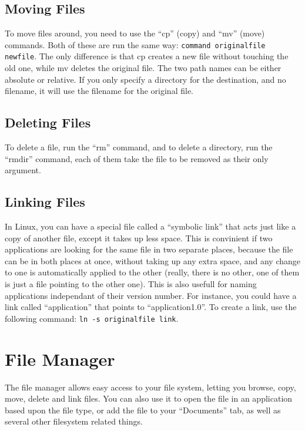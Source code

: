 \documentclass[12pt,letterpaper,oneside, openany]{book} \usepackage[latin1] {inputenc}
\begin{document}
\section{Moving Files}

To move files around, you need to use the ``cp'' (copy) and ``mv'' (move) commands.  Both of these are run the same way: \verb+command originalfile newfile+.  The only difference is that cp creates a new file without touching the old one, while mv deletes the original file.  The two path names can be either absolute or relative.  If you only specify a directory for the destination, and no filename, it will use the filename for the original file.

\section{Deleting Files}

To delete a file, run the ``rm'' command, and to delete a directory, run the ``rmdir'' command, each of them take the file to be removed as their only argument.

\section{Linking Files}

In Linux, you can have a special file called a ``symbolic link'' that acts just like a copy of another file, except it takes up less space.  This is convinient if two applications are looking for the same file in two separate places, because the file can be in both places at once, without taking up any extra space, and any change to one is automatically applied to the other (really, there is no other, one of them is just a file pointing to the other one).  This is also usefull for naming applications independant of their version number.  For instance, you could have a link called ``application'' that points to ``application1.0''.  To create a link, use the following command: \verb+ln -s originalfile link+.

\chapter{File Manager}
The file manager allows easy access to your file system, letting you browse, copy, move, delete and link files.  You can also use it to open the file in an application based upon the file type, or add the file to your ``Documents'' tab, as well as several other filesystem related things.
\end{document}
